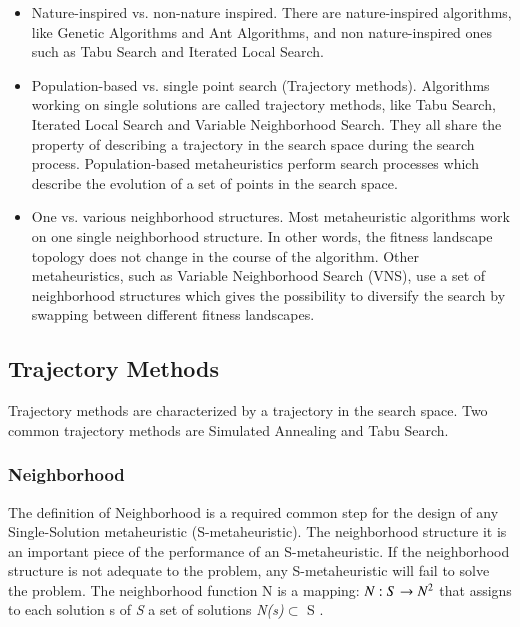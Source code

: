 \documentclass[espaco=umemeio,chapter=TITLE,twoside,openright]{abnt}
\begin{document}
\begin{itemize}
\item Nature-inspired vs. non-nature inspired. There are nature-inspired algorithms, like Genetic Algorithms and Ant Algorithms, and non nature-inspired ones such as Tabu Search and Iterated Local Search.

\item Population-based vs. single point search (Trajectory methods). Algorithms working on single solutions are called trajectory methods, like Tabu Search, Iterated Local Search and Variable Neighborhood Search. They all share the property of describing a trajectory in the search space during the search process. Population-based metaheuristics perform search processes which describe the evolution of a set of points in the search space.

\item One vs. various neighborhood structures. Most metaheuristic algorithms work on one single neighborhood structure. In other words, the fitness landscape topology does not change in the course of the algorithm. Other metaheuristics, such as Variable Neighborhood Search (VNS), use a set of neighborhood structures which gives the possibility to diversify the search by swapping between different fitness
landscapes.


\end{itemize}

\subsection{Trajectory Methods}

Trajectory methods are characterized by a trajectory in the search space. Two common trajectory methods are Simulated Annealing and Tabu Search.

\subsubsection{Neighborhood}

The definition of Neighborhood is a required common step for the design of any Single-Solution metaheuristic (S-metaheuristic). The neighborhood structure it is an important piece of the performance of an S-metaheuristic. If the neighborhood structure is not adequate to the problem,
any S-metaheuristic will fail to solve the problem. The neighborhood function N is a mapping: $ N : S \rightarrow N\textsuperscript{2} $ that assigns to each solution s of \textit{S} a set of solutions \textit{N(s)}$\subset$ S \cite{Talbi2013}.
\end{document}
